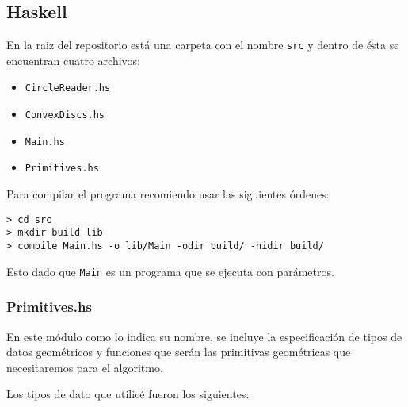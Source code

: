 \documentclass[12pt]{article}
\begin{document}
\subsection*{Haskell}

\noindent En la raiz del repositorio está una carpeta con el nombre \texttt{src} y dentro de ésta se encuentran cuatro archivos:

\begin{itemize}
\item \texttt{CircleReader.hs}
\item \texttt{ConvexDiscs.hs}
\item \texttt{Main.hs}
\item \texttt{Primitives.hs}
\end{itemize}

Para compilar el programa recomiendo usar las siguientes órdenes:

\begin{verbatim}
> cd src
> mkdir build lib
> compile Main.hs -o lib/Main -odir build/ -hidir build/
\end{verbatim}

Esto dado que \texttt{Main} es un programa que se ejecuta con parámetros.

\subsubsection*{Primitives.hs}

\noindent En este módulo como lo indica su nombre, se incluye la especificación de tipos de datos geométricos y funciones que serán las primitivas geométricas que necesitaremos para el algoritmo.

Los tipos de dato que utilicé fueron los siguientes:
\end{document}
